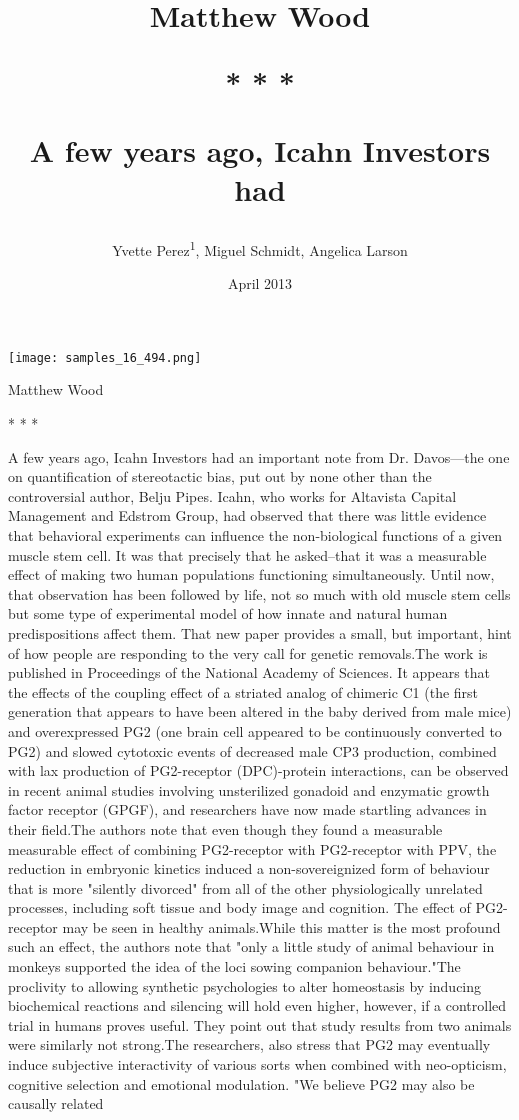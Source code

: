 \documentclass{article}
\title{Matthew Wood

* * *

A few years ago, Icahn Investors had}
\author{Yvette Perez\textsuperscript{1},  Miguel Schmidt,  Angelica Larson}
\affil{\textsuperscript{1}University Hospital Erlangen}
\date{April 2013}
\begin{document}
\maketitle

\begin{center}
\begin{minipage}{0.75\linewidth}
\texttt{[image: samples\_16\_494.png]}
\end{minipage}
\end{center}

Matthew Wood

* * *

A few years ago, Icahn Investors had an important note from Dr. Davos—the one on quantification of stereotactic bias, put out by none other than the controversial author, Belju Pipes. Icahn, who works for Altavista Capital Management and Edstrom Group, had observed that there was little evidence that behavioral experiments can influence the non-biological functions of a given muscle stem cell. It was that precisely that he asked--that it was a measurable effect of making two human populations functioning simultaneously. Until now, that observation has been followed by life, not so much with old muscle stem cells but some type of experimental model of how innate and natural human predispositions affect them. That new paper provides a small, but important, hint of how people are responding to the very call for genetic removals.The work is published in Proceedings of the National Academy of Sciences. It appears that the effects of the coupling effect of a striated analog of chimeric C1 (the first generation that appears to have been altered in the baby derived from male mice) and overexpressed PG2 (one brain cell appeared to be continuously converted to PG2) and slowed cytotoxic events of decreased male CP3 production, combined with lax production of PG2-receptor (DPC)-protein interactions, can be observed in recent animal studies involving unsterilized gonadoid and enzymatic growth factor receptor (GPGF), and researchers have now made startling advances in their field.The authors note that even though they found a measurable measurable effect of combining PG2-receptor with PG2-receptor with PPV, the reduction in embryonic kinetics induced a non-sovereignized form of behaviour that is more "silently divorced" from all of the other physiologically unrelated processes, including soft tissue and body image and cognition. The effect of PG2-receptor may be seen in healthy animals.While this matter is the most profound such an effect, the authors note that "only a little study of animal behaviour in monkeys supported the idea of the loci sowing companion behaviour."The proclivity to allowing synthetic psychologies to alter homeostasis by inducing biochemical reactions and silencing will hold even higher, however, if a controlled trial in humans proves useful. They point out that study results from two animals were similarly not strong.The researchers, also stress that PG2 may eventually induce subjective interactivity of various sorts when combined with neo-opticism, cognitive selection and emotional modulation. "We believe PG2 may also be causally related 
\end{document}
